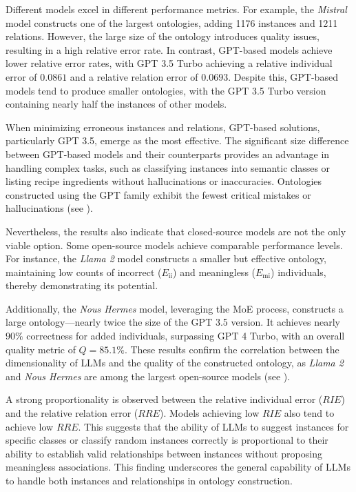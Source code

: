 Different models excel in different performance metrics.
%
For example, the \emph{Mistral} model constructs one of the largest ontologies, adding 1176 instances and 1211 relations.
%
However, the large size of the ontology introduces quality issues, resulting in a high relative error rate.
%
In contrast, GPT-based models achieve lower relative error rates, with GPT 3.5 Turbo achieving a relative individual error of \(0.0861\) and a relative relation error of \(0.0693\).
%
Despite this, GPT-based models tend to produce smaller ontologies, with the GPT 3.5 Turbo version containing nearly half the instances of other models.

When minimizing erroneous instances and relations, GPT-based solutions, particularly GPT 3.5, emerge as the most effective.
%
The significant size difference between GPT-based models and their counterparts provides an advantage in handling complex tasks, such as classifying instances into semantic classes or listing recipe ingredients without hallucinations or inaccuracies.
%
Ontologies constructed using the GPT family exhibit the fewest critical mistakes or hallucinations (see ).

Nevertheless, the results also indicate that closed-source models are not the only viable option.
%
Some open-source models achieve comparable performance levels.
%
For instance, the \emph{Llama 2} model constructs a smaller but effective ontology, maintaining low counts of incorrect (\(E_{\text{ii}}\)) and meaningless (\(E_{\text{mi}}\)) individuals, thereby demonstrating its potential.

Additionally, the \emph{Nous Hermes} model, leveraging the \gls{MoE} process, constructs a large ontology—nearly twice the size of the GPT 3.5 version.
%
It achieves nearly \(90\%\) correctness for added individuals, surpassing GPT 4 Turbo, with an overall quality metric of \(Q = 85.1\%\).
%
These results confirm the correlation between the dimensionality of \glspl{LLM} and the quality of the constructed ontology, as \emph{Llama 2} and \emph{Nous Hermes} are among the largest open-source models (see ).

A strong proportionality is observed between the relative individual error (\(\mathit{RIE}\)) and the relative relation error (\(\mathit{RRE}\)).
%
Models achieving low \(\mathit{RIE}\) also tend to achieve low \(\mathit{RRE}\).
%
This suggests that the ability of \glspl{LLM} to suggest instances for specific classes or classify random instances correctly is proportional to their ability to establish valid relationships between instances without proposing meaningless associations.
%
This finding underscores the general capability of \glspl{LLM} to handle both instances and relationships in ontology construction.


